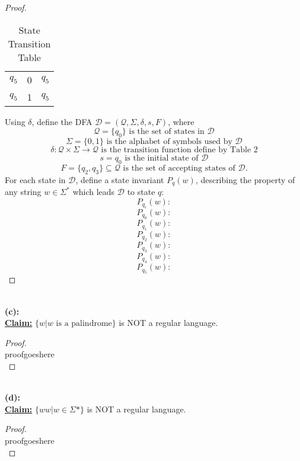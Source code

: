 \documentclass[12pt]{article}
\begin{document}
\begin{proof}
\begin{table}[!h]
\begin{tabular}{|c|c|c|}
            \( q_5 \) & 0 & \( q_5 \) \\
            \( q_5 \) & 1 & \( q_5 \) \\
            \hline
        \end{tabular}
        \caption{State Transition Table}
    \end{table}
    Using $\delta$, define the DFA $\mathcal{D} = (\mathcal{Q}, \Sigma, \delta, s, F)$, where
    \[
        \mathcal{Q} = \{ q_0 \} \text{ is the set of states in } \mathcal{D}
    \]
    \[
        \Sigma = \{ 0, 1 \} \text{ is the alphabet of symbols used by } \mathcal{D}
    \]
    \[
        \delta : \mathcal{Q} \times \Sigma \to \mathcal{Q} \text{ is the transition function define by Table 2}
    \]
    \[
        s = q_0 \text{ is the initial state of } \mathcal{D} 
    \]
    \[
        F = \{ q_2, q_3 \} \subseteq \mathcal{Q} \text{ is the set of accepting states of } \mathcal{D} \text{.}
    \]
    For each state in $\mathcal{D}$, define a state invariant $P_q(w)$, describing the property of any string $w \in \Sigma^*$ which leads $\mathcal{D}$ to state $q$:
    \[
        P_{q_\epsilon}(w): 
    \]
    \[
        P_{q_0}(w): 
    \]
    \[
        P_{q_1}(w): 
    \]
    \[
        P_{q_2}(w): 
    \]
    \[
        P_{q_3}(w): 
    \]
    \[
        P_{q_4}(w): 
    \]
    \[
        P_{q_5}(w): 
    \]
\end{proof}
\leavevmode\\
\textbf{(c):} \\
\textbf{\underline{Claim:}} $\{ w | w \text{ is a palindrome} \}$ is NOT a regular language.
\begin{proof}
\leavevmode\\
    proofgoeshere \\
\end{proof}
\leavevmode\\
\textbf{(d):} \\
\textbf{\underline{Claim:}} $\{ ww | w \in \Sigma* \}$ is NOT a regular language.
\begin{proof}
\leavevmode\\
    proofgoeshere \\
\end{proof}
\end{document}
